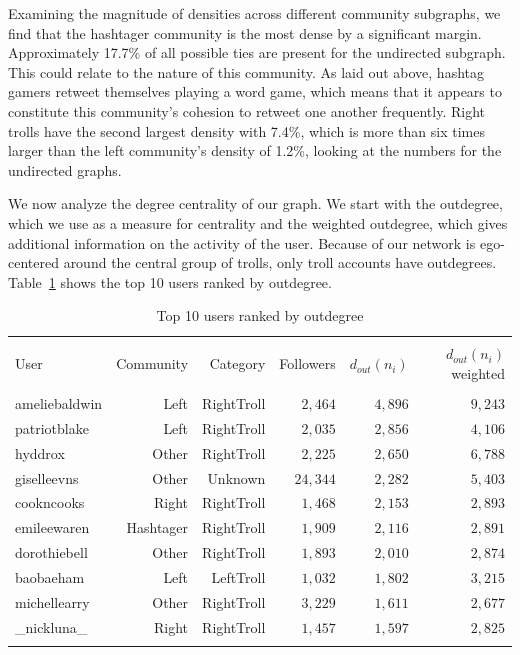 \documentclass[12pt, titlepage=true, toc=bib]{scrartcl}
\begin{document}
Examining the magnitude of densities across different community subgraphs, we find that the hashtager community is the most dense by a significant margin. Approximately 17.7\% of all possible ties are present for the undirected subgraph. This could relate to the nature of this community. As laid out above, hashtag gamers retweet themselves playing a word game, which means that it appears to constitute this community's cohesion to retweet one another frequently. Right trolls have the second largest density with 7.4\%, which is more than six times larger than the left community's density of 1.2\%, looking at the numbers for the undirected graphs.

We now  analyze the degree centrality of our graph. We start with the outdegree, which we use as a measure for centrality and the weighted outdegree, which gives additional information on the activity of the user. Because of our network is ego-centered around the central group of trolls, only troll accounts have outdegrees. Table~\ref{tab:out} shows the top 10 users ranked by outdegree.

\begin{table}[ht] \centering 
\begin{tabular*}{.95\linewidth}{@{\extracolsep{\fill}} lrrrrr} 
\\[-1.8ex]\hline 
\hline \\[-1.8ex] 
User & Community & Category & Followers & \( d_{out}(n_{i}) \) & \( d_{out}(n_{i}) \) weighted \\ 
\hline \\[-1.8ex] 
ameliebaldwin & Left & RightTroll & $2,464$ & $4,896$ & $9,243$ \\ 
patriotblake & Left & RightTroll & $2,035$ & $2,856$ & $4,106$ \\ 
hyddrox & Other & RightTroll & $2,225$ & $2,650$ & $6,788$ \\ 
giselleevns & Other & Unknown & $24,344$ & $2,282$ & $5,403$ \\ 
cookncooks & Right & RightTroll & $1,468$ & $2,153$ & $2,893$ \\ 
emileewaren & Hashtager & RightTroll & $1,909$ & $2,116$ & $2,891$ \\ 
dorothiebell & Other & RightTroll & $1,893$ & $2,010$ & $2,874$ \\ 
baobaeham & Left & LeftTroll & $1,032$ & $1,802$ & $3,215$ \\ 
michellearry & Other & RightTroll & $3,229$ & $1,611$ & $2,677$ \\ 
\_nickluna\_ & Right & RightTroll & $1,457$ & $1,597$ & $2,825$ \\ 
\hline \\[-1.8ex] 
\end{tabular*} 
  \caption{Top 10 users ranked by outdegree} 
  \label{tab:out} 
\end{table}  
\end{document}

